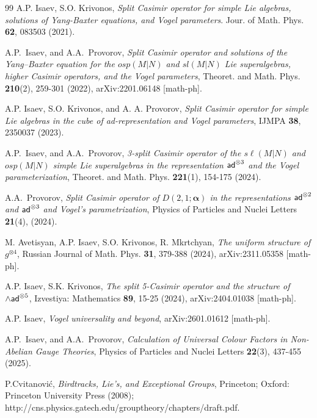 \documentclass[a4paper]{article}
\newcommand{\ad}{{\sf ad}}
\renewcommand{\=}{\ =\ }
\numberwithin{equation}{section}
\theoremstyle{remark}
\begin{document}
\begin{thebibliography}{99}
 A.P. Isaev, S.O. Krivonos, \textit{Split Casimir operator for simple Lie algebras,
solutions of Yang-Baxter equations, and Vogel parameters}. Jour. of Math. Phys. \textbf{62}, 083503 (2021).

 A.P.~Isaev, and A.A.~Provorov,
 \textit{Split Casimir operator and solutions of the Yang–Baxter equation for the $osp(M|N)$ and $sl(M|N)$ Lie superalgebras, higher Casimir operators, and the Vogel parameters}, Theoret. and Math. Phys. \textbf{210}(2), 259-301 (2022), arXiv:2201.06148 [math-ph].

A.P. Isaev, S.O. Krivonos, and A. A. Provorov, \textit{Split Casimir operator for simple Lie algebras in the cube of ad-representation and Vogel parameters}, IJMPA {\bf 38}, 2350037 (2023).

 A.P.~Isaev, and A.A.~Provorov, \textit{3-split Casimir operator of the $s\ell(M|N)$ and $osp(M|N)$ simple Lie superalgebras in the representation $\ad^{\otimes 3}$ and the Vogel parameterization}, Theoret. and Math. Phys. \textbf{221}(1), 154-175 (2024).

 A.A.~Provorov, \textit{Split Casimir operator of $D(2,1;\boldsymbol{\alpha})$ in the representations $\ad^{\otimes 2}$ and $\ad^{\otimes 3}$ and Vogel’s parametrization}, Physics of Particles and Nuclei Letters \textbf{21}(4), (2024).

 M. Avetisyan, A.P. Isaev, S.O. Krivonos, R. Mkrtchyan, \textit{The uniform structure of $g^{\otimes 4}$}, Russian Journal of Math. Phys. \textbf{31}, 379-388 (2024), arXiv:2311.05358 [math-ph].

 A.P. Isaev, S.K. Krivonos, \textit{The split 5-Casimir operator and the structure of $\wedge\ad^{\otimes 5}$}, Izvestiya: Mathematics \textbf{89}, 15-25 (2024), arXiv:2404.01038 [math-ph].

 A.P. Isaev, \textit{Vogel universality and beyond}, arXiv:2601.01612 [math-ph].

 A.P.~Isaev, and A.A.~Provorov, \textit{Calculation of Universal Colour Factors in Non-Abelian Gauge Theories}, Physics of Particles and Nuclei Letters \textbf{22}(3), 437-455 (2025).

 P.Cvitanovi\'{c}, \textit{Birdtracks, Lie's, and Exceptional Groups}, Princeton; Oxford: Princeton University Press (2008); \\
http://cns.physics.gatech.edu/grouptheory/chapters/draft.pdf.


\end{thebibliography}
\end{document}
